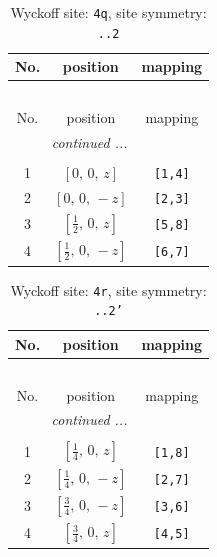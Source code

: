 \documentclass[fleqn,8pt]{jsarticle}
\begin{document}
\renewcommand{\arraystretch}{1.2}
\begin{longtable}{ccc}
\caption{Wyckoff site: {\tt 4q}, site symmetry: {\tt ..2}}
 \\
 \hline \hline
No. & position & mapping \\ \hline \endfirsthead

\multicolumn{2}{l}{\tablename\ \thetable{}} \\
 \hline \hline
No. & position & mapping \\ \hline \endhead

 \hline \hline
\multicolumn{2}{r}{\footnotesize\it continued ...} \\ \endfoot

 \hline \hline
\multicolumn{2}{r}{} \\ \endlastfoot

1 & $\left[ 0,\, 0,\, z \right]$ & {\tt [1,4]} \\ \hline
2 & $\left[ 0,\, 0,\, - z \right]$ & {\tt [2,3]} \\ \hline
3 & $\left[ \frac{1}{2},\, 0,\, z \right]$ & {\tt [5,8]} \\ \hline
4 & $\left[ \frac{1}{2},\, 0,\, - z \right]$ & {\tt [6,7]} \\
\end{longtable}
\renewcommand{\arraystretch}{1.2}
\begin{longtable}{ccc}
\caption{Wyckoff site: {\tt 4r}, site symmetry: {\tt ..2'}}
 \\
 \hline \hline
No. & position & mapping \\ \hline \endfirsthead

\multicolumn{2}{l}{\tablename\ \thetable{}} \\
 \hline \hline
No. & position & mapping \\ \hline \endhead

 \hline \hline
\multicolumn{2}{r}{\footnotesize\it continued ...} \\ \endfoot

 \hline \hline
\multicolumn{2}{r}{} \\ \endlastfoot

1 & $\left[ \frac{1}{4},\, 0,\, z \right]$ & {\tt [1,8]} \\ \hline
2 & $\left[ \frac{1}{4},\, 0,\, - z \right]$ & {\tt [2,7]} \\ \hline
3 & $\left[ \frac{3}{4},\, 0,\, - z \right]$ & {\tt [3,6]} \\ \hline
4 & $\left[ \frac{3}{4},\, 0,\, z \right]$ & {\tt [4,5]} \\
\end{longtable}
\end{document}
